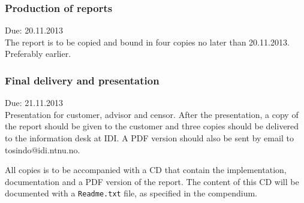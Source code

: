\documentclass[11pt]{book}
\begin{document}
\subsubsection{Production of reports}
Due: 20.11.2013\\
The report is to be copied and bound in four copies no later than 20.11.2013. Preferably earlier.

\subsubsection{Final delivery and presentation}
Due: 21.11.2013\\
Presentation for customer, advisor and censor. After the presentation, a copy of the report should be given to the customer and three copies should be delivered to the information desk at IDI. A PDF version should also be sent by email to tosindo@idi.ntnu.no.

All copies is to be accompanied with a CD that contain the implementation, documentation and a PDF version of the report. The content of this CD will be documented with a \texttt{Readme.txt} file, as specified in the compendium.
\end{document}
